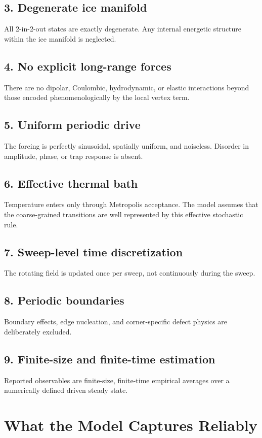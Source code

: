 \documentclass[11pt]{article}
\begin{document}
\subsection*{3. Degenerate ice manifold}
All 2-in-2-out states are exactly degenerate. Any internal energetic structure
within the ice manifold is neglected.

\subsection*{4. No explicit long-range forces}
There are no dipolar, Coulombic, hydrodynamic, or elastic interactions beyond
those encoded phenomenologically by the local vertex term.

\subsection*{5. Uniform periodic drive}
The forcing is perfectly sinusoidal, spatially uniform, and noiseless.
Disorder in amplitude, phase, or trap response is absent.

\subsection*{6. Effective thermal bath}
Temperature enters only through Metropolis acceptance. The model assumes that
the coarse-grained transitions are well represented by this effective stochastic
rule.

\subsection*{7. Sweep-level time discretization}
The rotating field is updated once per sweep, not continuously during the sweep.

\subsection*{8. Periodic boundaries}
Boundary effects, edge nucleation, and corner-specific defect physics are
deliberately excluded.

\subsection*{9. Finite-size and finite-time estimation}
Reported observables are finite-size, finite-time empirical averages over a
numerically defined driven steady state.

\section{What the Model Captures Reliably}
\end{document}

